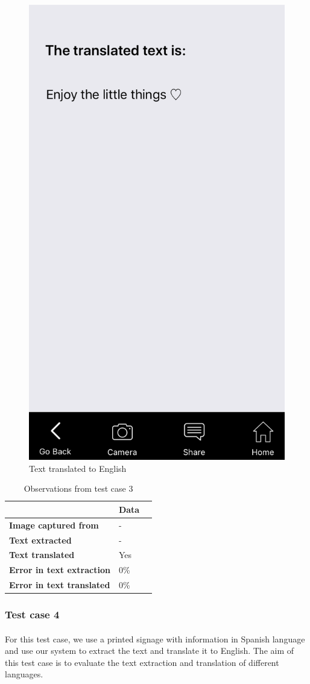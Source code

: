 \documentclass[12pt]{article}
\begin{document}
       \begin{figure}[H]
	\centering
	\includegraphics[width=0.5\linewidth]{media/case3-eng.PNG}
	\caption{Text translated to English}
	\label{fig:eng}
\end{figure} 


\begin{table}%
    \centering
    \caption{Observations from test case 3} 
    \label{my-label3}
       \begin{tabular}{|p{30mm}|p{35mm}|p{35mm}|}
 \hline
  & \textbf{Data}  \\ [0.5ex] 
 \hline\hline
 \textbf{Image captured from} & -  \\
 \hline
  \textbf{Text extracted} & -  \\
 \hline
 \textbf{Text translated} & Yes   \\
 \hline
 \textbf{Error in text extraction} & 0\%   \\
 \hline
 \textbf{Error in text translated} & 0\%   \\ [1ex] 
 \hline
    \end{tabular}
\end{table}

\subsubsection{Test case 4}
\label{threefour}
\paragraph{}For this test case, we use a printed signage with information in Spanish language and use our system to extract the text and translate it to English. The aim of this test case is to evaluate the text extraction and translation of different languages. 
\end{document}
